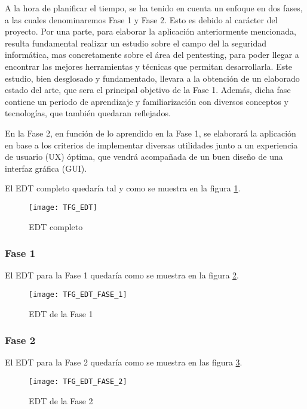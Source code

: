 A la hora de planificar el tiempo, se ha tenido en cuenta un enfoque en dos fases, a las cuales denominaremos Fase 1 y Fase 2. Esto es debido al carácter del proyecto. Por una parte, para elaborar la aplicación anteriormente mencionada, resulta fundamental realizar un estudio sobre el campo del la seguridad informática, mas concretamente sobre el área del pentesting, para poder llegar a encontrar las mejores herramientas y técnicas que permitan desarrollarla. Este estudio, bien desglosado y fundamentado, llevara a la obtención de un elaborado estado del arte, que sera el principal objetivo de la Fase 1. Además, dicha fase contiene un periodo de aprendizaje y familiarización con diversos conceptos y tecnologías, que también quedaran reflejados.

En la Fase 2, en función de lo aprendido en la Fase 1, se elaborará la aplicación en base a los criterios de implementar diversas utilidades junto a un experiencia de usuario (UX) óptima, que vendrá acompañada de un buen diseño de una interfaz gráfica (GUI).

El EDT completo quedaría tal y como se muestra en la figura \ref{fig:edt}.

\begin{landscape}
	
	\begin{figure}[H]
		\centering
		\texttt{[image: TFG\_EDT]}
		\caption{EDT completo}
		\label{fig:edt}
	\end{figure}
	
	\clearpage
	
	\subsubsection{Fase 1}
	El EDT para la Fase 1 quedaría como se muestra en la figura \ref{fig:edt1}.
	
	\begin{figure}[H]
		\centering
		\texttt{[image: TFG\_EDT\_FASE\_1]}
		\caption{EDT de la Fase 1}
		\label{fig:edt1}
	\end{figure}

\end{landscape}

\subsubsection{Fase 2}
El EDT para la Fase 2 quedaría como se muestra en las figura \ref{fig:edt2}.

\begin{figure}[H]
	\centering
	\texttt{[image: TFG\_EDT\_FASE\_2]}
	\caption{EDT de la Fase 2}
	\label{fig:edt2}
\end{figure}

